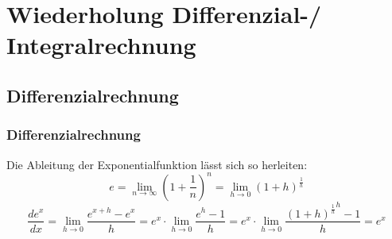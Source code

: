 \documentclass[
	11pt, %
]{beamer}
\begin{document}
%
\section{Wiederholung Differenzial-/ Integralrechnung}
\subsection{Differenzialrechnung}
\begin{frame}
	\frametitle{Differenzialrechnung}
	Die Ableitung der Exponentialfunktion l\"asst sich so herleiten:
	\begin{equation}
		e = \lim_{n \rightarrow \infty} \left(1 + \frac{1}{n}\right)^n = \lim_{h \rightarrow 0} \left(1 + h\right)^{\frac{1}{h}}
	\end{equation}
	\begin{equation}
		\frac{de^x}{dx}=\lim_{h \rightarrow 0} \frac{e^{x+h}-e^x}{h} = e^x\cdot\lim_{h \rightarrow 0} \frac{e^h-1}{h} = e^x\cdot\lim_{h \rightarrow 0} \frac{{\left(1 + h\right)^{\frac{1}{h}}}^h-1}{h}=e^x
	\end{equation}

\end{frame}
\end{document}

